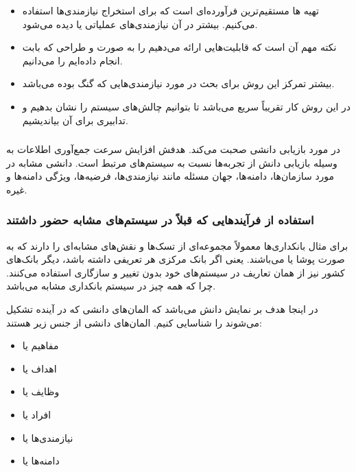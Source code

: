 \begin{itemize}
    \item تهیه ها مستقیم‌ترین فرآورده‌ای است که برای استخراج
    نیازمندی‌ها استفاده می‌کنیم. بیشتر در آن نیازمندی‌های عملیاتی یا
     دیده می‌شود.
    \item نکته مهم آن است که قابلیت‌هایی ارائه می‌دهیم را به صورت
     و طراحی که بابت  انجام داده‌ایم را
     می‌دانیم.
    \item بیشتر تمرکز این روش برای بحث در مورد نیازمندی‌هایی که گنگ بوده
    می‌باشد.
    \item در این روش کار تقریباً سریع می‌باشد تا بتوانیم چالش‌های سیستم را نشان
    بدهیم و تدابیری برای آن بیاندیشیم.
\end{itemize}


\subsubsection{}

در مورد بازیابی دانشی صحبت می‌کند. هدفش افزایش سرعت جمع‌آوری اطلاعات به وسیله
بازیابی دانش از تجربه‌ها نسبت به سیستم‌های مرتبط است. دانشی مشابه در مورد
سازمان‌ها، دامنه‌ها، جهان مسئله مانند نیازمندی‌ها، فرضیه‌ها، ویژگی دامنه‌ها و
غیره.

\subsubsection*{استفاده از فرآیند‌هایی که قبلاً در سیستم‌های مشابه حضور داشتند}

برای مثال بانکداری‌ها معمولاً مجموعه‌ای از تسک‌ها و نقش‌های مشابه‌ای را دارند که
به صورت پوشا یا  می‌باشند. یعنی اگر بانک مرکزی هر تعریفی داشته باشد،
دیگر بانک‌های کشور نیز از همان تعاریف در سیستم‌های خود بدون تغییر و سازگاری
استفاده می‌کنند. چرا که همه چیز در سیستم بانکداری مشابه می‌باشد.

در اینجا هدف بر نمایش دانش می‌باشد که المان‌های دانشی که در آینده تشکیل می‌شوند
را شناسایی کنیم. المان‌های دانشی از جنس زیر هستند:

\begin{itemize}
    \item مفاهیم یا 
    \item اهداف یا 
    \item وظایف یا 
    \item افراد یا 
    \item نیازمندی‌ها یا 
    \item دامنه‌ها یا 
\end{itemize}

